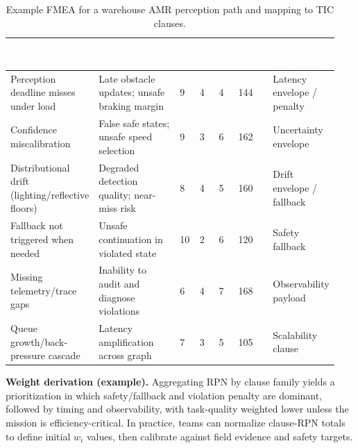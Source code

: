 \documentclass[smallextended]{svjour3}
\begin{document}
\begin{table}[htbp]
  \centering
  \caption{Example FMEA for a warehouse AMR perception path and mapping to TIC clauses.}
  \label{tab:fmea}
  \renewcommand{\arraystretch}{1.15}
  \setlength{\tabcolsep}{3pt}
  \begin{tabular}{@{}L{0.26\linewidth}L{0.26\linewidth}C{0.06\linewidth}C{0.06\linewidth}C{0.06\linewidth}C{0.08\linewidth}L{0.16\linewidth}@{}}
    \toprule
    \textcolor{white}{\textbf{Failure mode}} &
    \textcolor{white}{\textbf{Effect}} &
    \textcolor{white}{\textbf{S}} &
    \textcolor{white}{\textbf{O}} &
    \textcolor{white}{\textbf{D}} &
    \textcolor{white}{\textbf{RPN}} &
    \textcolor{white}{\textbf{Primary TIC clause}} \\
    \midrule
    Perception deadline misses under load & Late obstacle updates; unsafe braking margin & 9 & 4 & 4 & 144 & Latency envelope / penalty \\
    Confidence miscalibration & False safe states; unsafe speed selection & 9 & 3 & 6 & 162 & Uncertainty envelope \\
    Distributional drift (lighting/reflective floors) & Degraded detection quality; near-miss risk & 8 & 4 & 5 & 160 & Drift envelope / fallback \\
    Fallback not triggered when needed & Unsafe continuation in violated state & 10 & 2 & 6 & 120 & Safety fallback \\
    Missing telemetry/trace gaps & Inability to audit and diagnose violations & 6 & 4 & 7 & 168 & Observability payload \\
    Queue growth/back-pressure cascade & Latency amplification across graph & 7 & 3 & 5 & 105 & Scalability clause \\
    \bottomrule
  \end{tabular}
  \renewcommand{\arraystretch}{1}
\end{table}

\noindent\textbf{Weight derivation (example).} Aggregating RPN by clause family yields a
prioritization in which safety/fallback and violation penalty are dominant, followed by
timing and observability, with task-quality weighted lower unless the mission is
efficiency-critical. In practice, teams can normalize clause-RPN totals to define initial
\(w_i\) values, then calibrate against field evidence and safety targets.

\FloatBarrier
\end{document}
